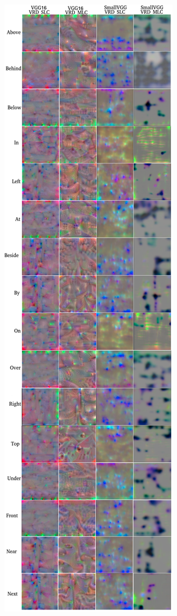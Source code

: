 \documentclass{IEEEtran}
\begin{document}
\begin{figure}[!htbp]
	\includegraphics[scale=0.40]{VGG16_Small_VRD.pdf}
	\vspace{-4mm}
\end{figure}
\end{document}
